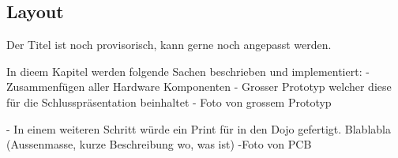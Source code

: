\subsection{Layout} \label{sec:layout}
Der Titel ist noch provisorisch, kann gerne noch angepasst werden.

In dieem Kapitel werden folgende Sachen beschrieben und implementiert:
- Zusammenfügen aller Hardware Komponenten
- Grosser Prototyp welcher diese für die Schlusspräsentation beinhaltet
- Foto von grossem Prototyp

- In einem weiteren Schritt würde ein Print für in den Dojo gefertigt. Blablabla (Aussenmasse, kurze Beschreibung wo, was ist)
-Foto von PCB 
